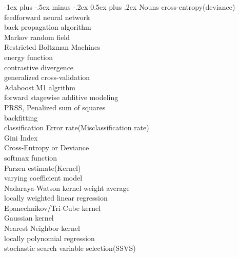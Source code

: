 \documentclass[12pt, plandscape]{article}
\makeatletter
\renewcommand{\section}{\@startsection{section}{1}{0mm}%
                                {-1ex plus -.5ex minus -.2ex}%
                                {0.5ex plus .2ex}%
                                {\normalfont\large\bfseries}}
\makeatother
\begin{document}
\begin{multicols}{3}
\section{Nouns}
cross-entropy(deviance)\\
feedforward neural network\\
back propagation algorithm\\
Markov random field\\
Restricted Boltzman Machines\\
energy function\\
contrastive divergence\\
generalized cross-validation\\
Adaboost.M1 algrithm\\
forward stagewise additive modeling\\
PRSS, Penalized sum of squares\\
backfitting\\
classification Error rate(Misclassification rate)\\
Gini Index\\
Cross-Entropy or Deviance\\
softmax function\\
Parzen estimate(Kernel)\\
varying coefficient model\\
Nadaraya-Watson kernel-weight average\\
locally weighted linear regression\\
Epanechnikov/Tri-Cube kernel\\
Gaussian kernel\\
Nearest Neighbor kernel\\
locally polynomial regression\\
stochastic search variable selection(SSVS)\\


































%
%
\end{multicols}
\end{document}
